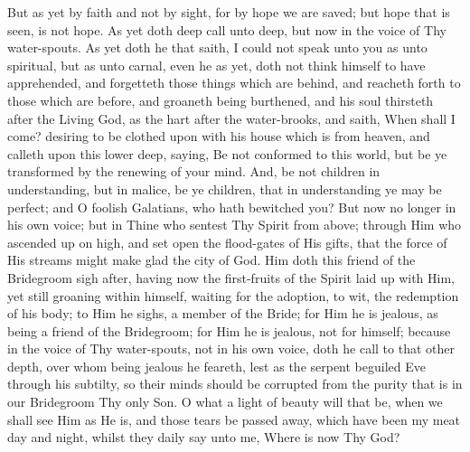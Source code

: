 \documentclass[b5paper,openright,12pt,twoside]{book}
\begin{document}
But as yet by faith and not by sight, for by hope we are saved; but hope
that is seen, is not hope. As yet doth deep call unto deep, but now in
the voice of Thy water-spouts. As yet doth he that saith, I could not
speak unto you as unto spiritual, but as unto carnal, even he as yet,
doth not think himself to have apprehended, and forgetteth those things
which are behind, and reacheth forth to those which are before, and
groaneth being burthened, and his soul thirsteth after the Living
God, as the hart after the water-brooks, and saith, When shall I come?
desiring to be clothed upon with his house which is from heaven, and
calleth upon this lower deep, saying, Be not conformed to this world,
but be ye transformed by the renewing of your mind. And, be not children
in understanding, but in malice, be ye children, that in understanding
ye may be perfect; and O foolish Galatians, who hath bewitched you? But
now no longer in his own voice; but in Thine who sentest Thy Spirit from
above; through Him who ascended up on high, and set open the flood-gates
of His gifts, that the force of His streams might make glad the city of
God. Him doth this friend of the Bridegroom sigh after, having now the
first-fruits of the Spirit laid up with Him, yet still groaning within
himself, waiting for the adoption, to wit, the redemption of his body;
to Him he sighs, a member of the Bride; for Him he is jealous, as being
a friend of the Bridegroom; for Him he is jealous, not for himself;
because in the voice of Thy water-spouts, not in his own voice, doth he
call to that other depth, over whom being jealous he feareth, lest as
the serpent beguiled Eve through his subtilty, so their minds should be
corrupted from the purity that is in our Bridegroom Thy only Son. O
what a light of beauty will that be, when we shall see Him as He is,
and those tears be passed away, which have been my meat day and night,
whilst they daily say unto me, Where is now Thy God?
\end{document}

